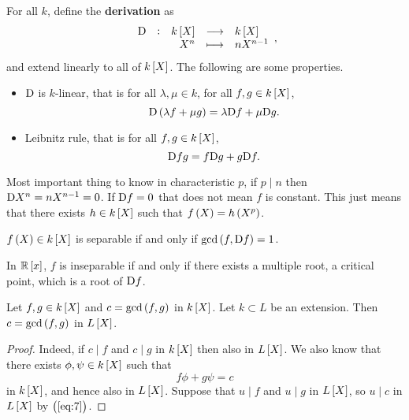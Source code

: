 \pagebreak

For all $ k $, define the \textbf{derivation} as
$$ \function[\D]{k\sbr{X}}{k\sbr{X}}{X^n}{nX^{n - 1}}, $$
and extend linearly to all of $ k\sbr{X} $. The following are some properties.
\begin{itemize}
\item $ \mathrm{D} $ is $ k $-linear, that is for all $ \lambda, \mu \in k $, for all $ f, g \in k\sbr{X} $,
$$ \D \br{\lambda f + \mu g} = \lambda \D f + \mu \D g. $$
\item Leibnitz rule, that is for all $ f, g \in k\sbr{X} $,
$$ \mathrm{D} fg = f\mathrm{D} g + g\mathrm{D} f. $$
\end{itemize}
Most important thing to know in characteristic $ p $, if $ p \mid n $ then $ \mathrm{D} X^n = nX^{n - 1} = 0 $. If $ \mathrm{D} f = 0 $ that does not mean $ f $ is constant. This just means that there exists $ h \in k\sbr{X} $ such that $ f\br{X} = h\br{X^p} $.

\begin{proposition}
\label{prop:separable}
$ f\br{X} \in k\sbr{X} $ is separable if and only if $ \gcd\br{f, \D f} = 1 $.
\end{proposition}

In $ \RR\sbr{x} $, $ f $ is inseparable if and only if there exists a multiple root, a critical point, which is a root of $ \mathrm{D} f $.


\begin{lemma}
Let $ f, g \in k\sbr{X} $ and $ c = \gcd\br{f, g} $ in $ k\sbr{X} $. Let $ k \subset L $ be an extension. Then $ c = \gcd\br{f, g} $ in $ L\sbr{X} $.
\end{lemma}

\begin{proof}
Indeed, if $ c \mid f $ and $ c \mid g $ in $ k\sbr{X} $ then also in $ L\sbr{X} $. We also know that there exists $ \phi, \psi \in k\sbr{X} $ such that
\begin{equation}
\label{eq:7}
f\phi + g\psi = c
\end{equation}
in $ k\sbr{X} $, and hence also in $ L\sbr{X} $. Suppose that $ u \mid f $ and $ u \mid g $ in $ L\sbr{X} $, so $ u \mid c $ in $ L\sbr{X} $ by $ \br{\ref{eq:7}} $.
\end{proof}

